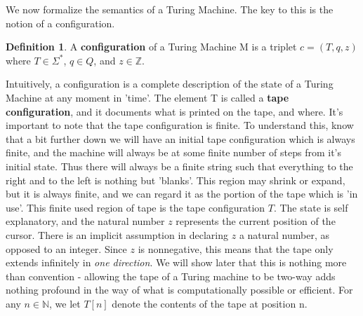 \documentclass{article}
\theoremstyle{definition}
\newtheorem{definition}{Definition}[section]
\theoremstyle{plain}
\theoremstyle{theorem}
\begin{document}
\vspace{1cm}
\begin{center}
\end{center}
We now formalize the semantics of a Turing Machine. The key to this is the notion of a configuration.
\begin{definition}
A \textbf{configuration} of a Turing Machine M is a triplet $c=(T,q,z)$ where $T\in\Sigma^*$, $q\in Q$, and $z\in\mathbb{Z}$.  
\end{definition}
Intuitively, a configuration is a complete description of the state of a Turing Machine at any moment in 'time'. The element T is called a \textbf{tape configuration}, and it documents what is printed on the tape, and where. It's important to note that the tape configuration is finite. To understand this, know that a bit further down we will have an initial tape configuration which is always finite, and the machine will always be at some finite number of steps from it's initial state. Thus there will always be a finite string such that everything to the right and to the left is nothing but 'blanks'. This region may shrink or expand, but it is always finite, and we can regard it as the portion of the tape which is 'in use'. This finite used region of tape is the tape configuration $T$. The state is self explanatory, and the natural number $z$ represents the current position of the cursor. There is an implicit assumption in declaring $z$ a natural number, as opposed to an integer. Since $z$ is nonnegative, this means that the tape only extends infinitely in \textit{one direction}. We will show later that this is nothing more than convention - allowing the tape of a Turing machine to be two-way adds nothing profound in the way of what is computationally possible or efficient. For any $n\in\mathbb{N}$, we let $T[n]$ denote the contents of the tape at position n.
\end{document}
